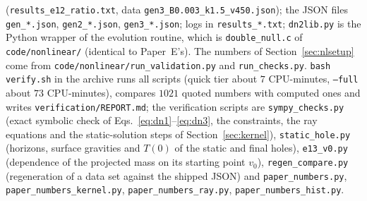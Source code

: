 \documentclass[11pt]{article}
\begin{document}
(\texttt{results\_e12\_ratio.txt}, data \texttt{gen3\_B0.003\_k1.5\_v450.json}); the JSON files \texttt{gen\_*.json}, \texttt{gen2\_*.json}, \texttt{gen3\_*.json}; logs in \texttt{results\_*.txt}; \texttt{dn2lib.py} is the Python wrapper of the evolution routine, which is \texttt{double\_null.c} of \texttt{code/nonlinear/} (identical to Paper~E's). The numbers of Section~\ref{sec:nlsetup} come from \texttt{code/nonlinear/run\_validation.py} and \texttt{run\_checks.py}. \texttt{bash verify.sh} in the archive runs all scripts (quick tier about $7$ CPU-minutes, \texttt{--full} about $73$ CPU-minutes), compares $1021$ quoted numbers with computed ones and writes \texttt{verification/REPORT.md}; the verification scripts are \texttt{sympy\_checks.py} (exact symbolic check of Eqs.~\eqref{eq:dn1}--\eqref{eq:dn3}, the constraints, the ray equations and the static-solution steps of Section~\ref{sec:kernel}), \texttt{static\_hole.py} (horizons, surface gravities and $T(0)$ of the static and final holes), \texttt{e13\_v0.py} (dependence of the projected mass on its starting point $v_0$), \texttt{regen\_compare.py} (regeneration of a data set against the shipped JSON) and \texttt{paper\_numbers.py}, \texttt{paper\_numbers\_kernel.py}, \texttt{paper\_numbers\_ray.py}, \texttt{paper\_numbers\_hist.py}.



\end{document}
